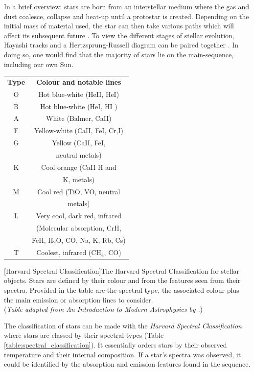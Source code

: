 \documentclass[12pt, twocolumn]{revtex4}    %
\begin{document}
In a brief overview: stars are born from an interstellar medium where the gas and dust coalesce, collapse and heat-up until a protostar is created. Depending on the initial mass of material used, the star can then take various paths which will affect its subsequent future \citep{mccoy_space_sciences}. To view the different stages of stellar evolution, Hayashi tracks and a Hertzsprung-Russell diagram can be paired together \citep{carroll_astro}. In doing so, one would find that the majority of stars lie on the main-sequence, including our own Sun.  

\begin{center}
\begin{tabular}{c@{\hskip 20pt}c} 
 \hline
 \textbf{Type} & \textbf{Colour and notable lines} \\ [0.5ex] 
 O & Hot blue-white (HeII, HeI) \\
 B & Hot blue-white (HeI, HI ) \\
 A & White (Balmer, CaII) \\
 F & Yellow-white (CaII, FeI, Cr,I) \\
 G & Yellow (CaII, FeI,  \\
  & neutral metals) \\
 K & Cool orange (CaII H and \\ 
  & K, metals) \\
 M & Cool red (TiO, VO, neutral \\
  & metals) \\
 L & Very cool, dark red, infrared \\
  & (Molecular absorption, CrH, \\
  & FeH, H$_2$O, CO, Na, K, Rb, Cs) \\
 T & Coolest, infrared (CH$_4$, CO) \\
 \hline
\end{tabular}
[Harvard Spectral Classification]{The Harvard Spectral Classification for stellar objects. Stars are defined by their colour and from the features seen from their spectra. Provided in the table are the spectral type, the associated colour plus the main emission or absorption lines to consider. \\
(\textit{Table adapted from An Introduction to Modern Astrophysics by \cite{carroll_astro}}.)}
\label{table:spectral_classification}
\end{center}


The classification of stars can be made with the \textit{Harvard Spectral Classification} where stars are classed by their spectral types (Table \ref{table:spectral_classification}). It essentially orders stars by their observed temperature and their internal composition. If a star's spectra was observed, it could be identified by the absorption and emission features found in the sequence.   
\end{document}
